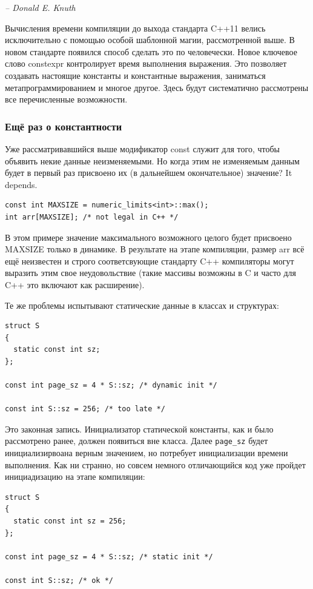 \documentclass[a4paper,12pt,oneside]{article}
\begin{document}
\hfill\textit{-- Donald E. Knuth}

Вычисления времени компиляции до выхода стандарта C++11 велись исключительно с помощью особой шаблонной магии, рассмотренной выше. В новом стандарте появился способ сделать это по человечески. Новое ключевое слово constexpr контролирует время выполнения выражения. Это позволяет создавать настоящие константы и константные выражения, заниматься метапрограммированием и многое другое. Здесь будут систематично рассмотрены все перечисленные возможности.

\subsubsection{Ещё раз о константности}

Уже рассматривавшийся выше модификатор const служит для того, чтобы объявить некие данные неизменяемыми. Но когда этим не изменяемым данным будет в первый раз присвоено их (в дальнейшем окончательное) значение? It depends.

\begin{lstlisting}
const int MAXSIZE = numeric_limits<int>::max();
int arr[MAXSIZE]; /* not legal in C++ */
\end{lstlisting}

В этом примере значение максимального возможного целого будет присвоено MAXSIZE только в динамике. В результате на этапе компиляции, размер arr всё ещё неизвестен и строго соответсвующие стандарту C++ компиляторы могут выразить этим свое неудовольствие (такие массивы возможны в C и часто для C++ это включают как расширение).

Те же проблемы испытывают статические данные в классах и структурах:

\begin{lstlisting}
struct S 
{
  static const int sz;
};

const int page_sz = 4 * S::sz; /* dynamic init */

const int S::sz = 256; /* too late */
\end{lstlisting}

Это законная запись. Инициализатор статической константы, как и было рассмотрено ранее, должен появиться вне класса. Далее \lstinline!page_sz! будет инициализирвоана верным значением, но потребует инициализации времени выполнения. Как ни странно, но совсем немного отличающийся код уже пройдет инициадизацию на этапе компиляции:

\begin{lstlisting}
struct S 
{
  static const int sz = 256;
};

const int page_sz = 4 * S::sz; /* static init */

const int S::sz; /* ok */
\end{lstlisting}
\end{document}
